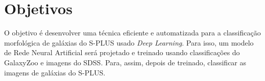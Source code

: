 \section*{Objetivos}

O objetivo é desenvolver uma técnica eficiente e automatizada para a  classificação morfológica de galáxias do S-PLUS usado \emph{Deep Learning}. Para isso, um modelo de Rede Neural Artificial será projetado e treinado usando classificações do GalaxyZoo e imagens do SDSS. Para, assim, depois de treinado, classificar as imagens de galáxias do S-PLUS.
